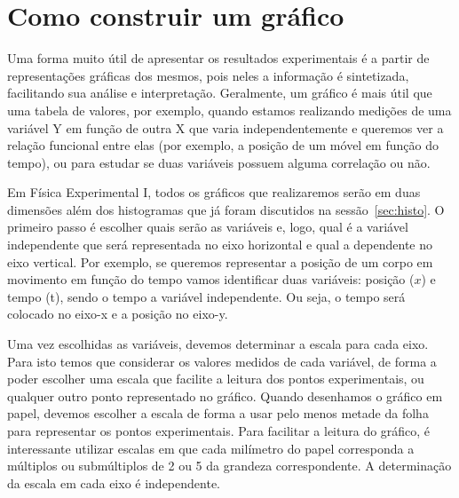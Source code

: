 \section*{Como construir um gráfico}\label{plot}

Uma forma muito útil de apresentar os resultados experimentais é a partir de re\-pre\-sen\-ta\-ções gráficas dos mesmos, pois neles a informação é sintetizada, facilitando sua análise e interpretação. Geralmente, um gráfico é mais útil que uma tabela de valores, por exemplo, quando estamos realizando medições de uma variável Y em função de outra X que varia independentemente e queremos ver a relação funcional entre elas (por exemplo, a posição de um móvel em função do tempo), ou para estudar se duas variáveis possuem alguma correlação ou não.

Em Física Experimental I, todos os gráficos que realizaremos serão em duas dimensões além dos histogramas que já foram discutidos na sessão~\ref{sec:histo}. O primeiro passo é escolher quais serão as variáveis e, logo, qual é a variável independente que será representada no eixo horizontal e qual a dependente no eixo vertical.  Por exemplo, se queremos representar a posição de um corpo em movimento em função do tempo vamos identificar duas variáveis:  posição ($x$) e tempo (t), sendo o tempo a variável independente.  Ou seja, o tempo será colocado no eixo-x e a posição no eixo-y. 

Uma vez escolhidas as variáveis, devemos determinar a escala para cada eixo. Para isto temos que considerar os valores medidos de cada variável, de forma a poder escolher uma escala que facilite a leitura dos pontos experimentais, ou qualquer outro ponto representado no gráfico.  Quando desenhamos o gráfico em papel, devemos escolher a escala de forma a usar pelo menos metade da folha para representar os pontos experimentais. Para facilitar a leitura do gráfico, é interessante utilizar escalas em que cada milímetro do papel corresponda a múltiplos ou submúltiplos de 2 ou 5 da grandeza correspondente. A determinação da escala em cada eixo é independente.   


